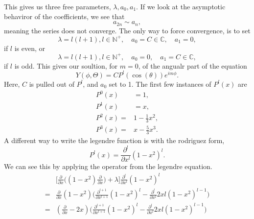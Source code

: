\documentclass{article}
\begin{document}
        This gives us three free parameters, \(\lambda, a_0, a_1\). If we look at the asymptotic behaviror of the coefficients, we see that
        \begin{equation*}
            a_{2n} \sim a_n, 
        \end{equation*}
        meaning the series does not converge. The only way to force convergence, is to set
        \begin{equation*}
            \lambda = l(l + 1), l \in \mathbb{N^+}, \quad a_0 = C \in \mathbb{C}, \quad a_1 = 0, 
        \end{equation*}
        if \(l\) is even, or
        \begin{equation*}
            \lambda = l(l + 1), l \in \mathbb{N^+}, \quad a_0 = 0, \quad a_1 = C \in \mathbb{C}, 
        \end{equation*}
        if \(l\) is odd.
        This gives our soultion, for \(m = 0\), of the angualr part of the equation
        \begin{equation*}
            Y(\phi, \Theta) = C P^l(\cos(\theta))e^{im\phi}.
        \end{equation*}
        Here, \(C\) is pulled out of \(P^l\), and \(a_0\) set to 1. The first few instances of \(P^l(x)\) are
        \begin{align*}
            P^0(x) &= 1,\\
            P^1(x) &= x,\\
            P^2(x) = & 1 - \frac{1}{3}x^2, \\
            P^3(x) = & x - \frac{5}{3}x^3.
        \end{align*}
        A different way to write the legendre function is with the rodriguez form,
        \begin{equation*}
            P^l(x) = \frac{\partial^l}{\partial x^l}(1 - x^2)^l. 
        \end{equation*}
        We can see this by applying the operator from the legendre equation.
        \begin{align*}
            & \bigg[\frac{\partial}{\partial x} \bigg( (1 - x^2) \frac{\partial}{\partial x} \bigg)+ \lambda  \bigg] \frac{\partial^l}{\partial x^l}(1 - x^2)^l \\ 
            = & \frac{\partial}{\partial x}(1 - x^2)\bigg(\frac{\partial^{l+1}}{\partial x^{l + 1}}(1 - x^2)^l - \frac{\partial^l}{\partial x^l}2xl(1 - x^2)^{l - 1}\bigg) \\ 
            = & (\frac{\partial}{\partial x} - 2x)\bigg(\frac{\partial^{l+1}}{\partial x^{l + 1}}(1 - x^2)^l - \frac{\partial^l}{\partial x^l}2xl(1 - x^2)^{l - 1}\bigg)
        \end{align*}
\end{document}
